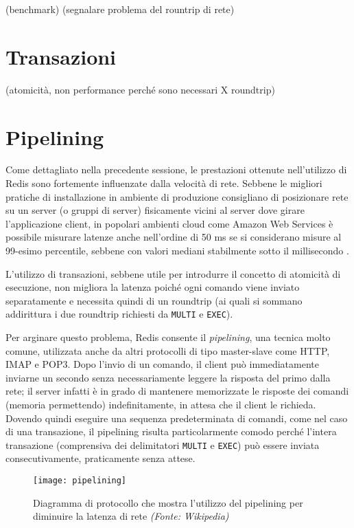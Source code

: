 (benchmark)
(segnalare problema del rountrip di rete)


\section{Transazioni}

(atomicità, non performance perché sono necessari X roundtrip)


\section{Pipelining}

Come dettagliato nella precedente sessione, le prestazioni ottenute nell'utilizzo di Redis sono
fortemente influenzate dalla velocità di rete. Sebbene le migliori pratiche di installazione in
ambiente di produzione consigliano di posizionare rete su un server (o gruppi di server) fisicamente
vicini al server dove girare l'applicazione client, in popolari ambienti cloud come Amazon Web
Services è possibile misurare latenze anche nell'ordine di 50 ms se si considerano misure al
99-esimo percentile, sebbene con valori mediani stabilmente sotto il millisecondo
\cite{aws-latency}.

L'utilizzo di transazioni, sebbene utile per introdurre il concetto di atomicità di esecuzione,
non migliora la latenza poiché ogni comando viene inviato separatamente e necessita quindi di un 
roundtrip (ai quali si sommano addirittura i due roundtrip richiesti da \verb|MULTI| e \verb|EXEC|).

Per arginare questo problema, Redis consente il \emph{pipelining}, una tecnica molto comune, 
utilizzata anche da altri protocolli di tipo master-slave come HTTP, IMAP e POP3. Dopo l'invio 
di un comando, il client può immediatamente inviarne un secondo senza necessariamente leggere
la risposta del primo dalla rete; il server infatti è in grado di mantenere memorizzate le risposte
dei comandi (memoria permettendo) indefinitamente, in attesa che il client le richieda. Dovendo
quindi eseguire una sequenza predeterminata di comandi, come nel caso di una transazione, il
pipelining risulta particolarmente comodo perché l'intera transazione (comprensiva dei delimitatori
\verb|MULTI| e \verb|EXEC|) può essere inviata consecutivamente, praticamente senza attese.

\begin{figure}
	\centering
		\texttt{[image: pipelining]}
	\caption{Diagramma di protocollo che mostra l'utilizzo del pipelining per diminuire la latenza
	di rete \emph{(Fonte: Wikipedia)}}
\end{figure}

